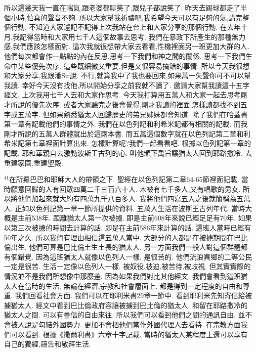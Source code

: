 \documentclass{book}
\begin{document}
所以這幾天我一直在喘氣,跟老婆都聊笑了,跟兒子都說笑了.
昨天去踢球都走了半個小時,怕真的聲音不夠.
所以大家幫我祈禱吧,我希望今天可以有足夠的氣,講完整個行動.
不知道大家還記不記得上次我站在台上和大家分享的那個行動.
在去年十月,我記得當時和大家用七千人這個故事去思考.
我們在暴政下所產生的那種無力感,我們應該怎樣面對.
這次我就很想帶大家去看看,性機裡面另一班更加大群的人.
他們每次都會作一點點的內在反思,思考一下我們和神之間的關係.
思考一下我們生命中某些優先次序.
這些既細微又重要,但是又很容易搞錯的事情.
所以今天我很想和大家分享,我跟潘Sir說.
不行,就算我中了我也要回來,如果萬一失聲你可不可以幫我讀.
幸好今天沒有找他,所以開始分享之前我就不讀了.
邀請大家幫我讀這十五字經文.
上次我用七千人去和大家作思考.
今天我打算用五萬人和大家一起去思考剛才所說的優先次序.
或者大家聽完之後會覺得,剛才我讀的裡面,怎樣讀都找不到五字或五萬字.
但如果熟悉猶太人回歸歷史的弟兄姊妹都會知道.
除了我們在哈蓋書第一章有記載他們的事情之外.
我們在以色列記和利希米記都有相關的記載.
而我剛才所說的五萬人群體就出於這兩本書.
而五萬這個數字就在以色列記第二章和利希米記第七章裡面計算出來.
怎樣計算呢?我們一起看看吧.
根據以色列記第一章的記載.
耶和華親自去激動波斯王古列的心.
叫他頒下禹旨讓猶太人回到耶路撒冷.
去重建家園,重建聖殿.

$^{41}$在所羅巴巴和耶穌大人的帶領之下.
聖經在以色列記第二章64-65節裡面記載.
當時願意回歸的人有回眾四萬二千三百六十人.
木被有七千多人,又有唱歌的男女.
所以將他們加起來就大約有四萬九千八百多人.
我將他們四寫五入之後就簡稱為五萬人.
正如以色列記第一章一節所提供的資料.
五萬人生活在波斯王古列年代.
當時大概是主前538年.
距離猶太人第一次被擄.
即是主前608年來說已經足足有70年.
如果以第三次被擄的時間去計算的話.
即是在主前586年來計算的話.
這班人當時已經有50年之久.
所以我們有理由相信這五萬人當中.
大部分的人都是在被擄期間在巴比倫出生.
他們可算是巴比倫土生土長的猶太人.
另一方面我們一般人對這個群體都有個錯覺.
因為這班猶太人就像以色列人一樣.
是很苦的.
他們流浪異鄉的二等公民一定是很苦.
生活一定像以色列人一樣.
被奴役,被迫,被苦待,被歧視.
但其實實際的情況並不是我們所想像中那麼差.
因為如果我們對比其他經文.
我們會看到這班猶太人在當時的生活.
無論在經濟,宗教和社會層面上.
都是得到一定程度的自由和尊重.
我們回看社會方面.
我們可以在耶利米書29章一節中.
看到耶利米先知寄信給被擄猶太人.
經文中看到巴比倫政府容讓被擄到巴比倫的猶太人.
和留在耶路撒冷的猶太人之間.
可以有書信的自由來往.
所以我們可以看到他們之間的通訊自由.
並不會被人說是勾結外國勢力.
更加不會把他們當作外國代理人去看待.
在宗教方面我們可以看到.
根據《撒爾利書》六章十字記載.
當時的猶太人某程度上還可以享有自己的獨經,禱告和敬拜生活.
\end{document}
